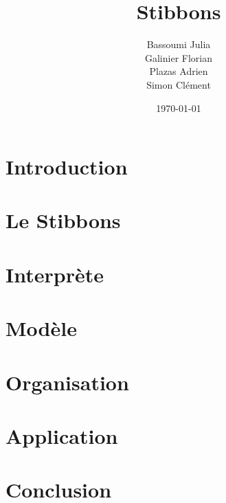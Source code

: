 \documentclass[11pt,handout]{beamer}
\title{Stibbons}
\author{Bassoumi Julia \\ Galinier Florian \\ Plazas Adrien \\ Simon Clément}
\date{\today}
\begin{document}
\begin{frame}
\titlepage
\end{frame}

\begin{frame}
\tableofcontents
\end{frame}

\section{Introduction}


\section{Le Stibbons}
 
\section{Interprète}


\section{Modèle}


\section{Organisation}


\section{Application}


\section{Conclusion}

\end{document}

